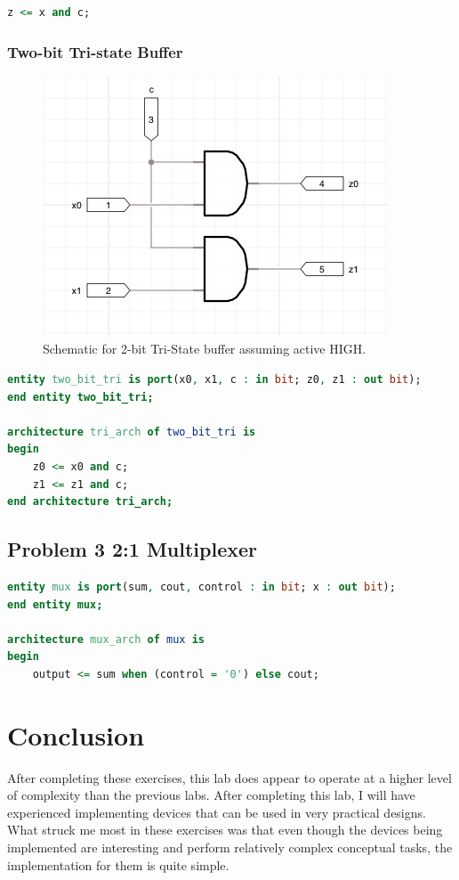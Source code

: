 \documentclass[11pt]{article}
\begin{document}
\begin{lstlisting}[language=VHDL]
	z <= x and c;
\end{lstlisting}


\subsubsection{Two-bit Tri-state Buffer}

\begin{figure}[H]
\begin{center}
	\includegraphics{img3_1.png}
	\caption{\label{fig:triStateSchematic} Schematic for 2-bit Tri-State buffer assuming active HIGH.}
\end{center}
\end{figure}

\begin{lstlisting}[language=VHDL]
entity two_bit_tri is port(x0, x1, c : in bit; z0, z1 : out bit);
end entity two_bit_tri;
	
architecture tri_arch of two_bit_tri is
begin
	z0 <= x0 and c;
	z1 <= z1 and c;
end architecture tri_arch;
\end{lstlisting}

\subsection{Problem 3 2:1 Multiplexer}

\begin{lstlisting}[language=VHDL]
entity mux is port(sum, cout, control : in bit; x : out bit);
end entity mux;

architecture mux_arch of mux is
begin
	output <= sum when (control = '0') else cout;	
\end{lstlisting}

\section{Conclusion}

After completing these exercises, this lab does appear to operate at a higher level of complexity than the previous labs. After completing this lab, I will have experienced implementing devices that can be used in very practical designs. What struck me most in these exercises was that even though the devices being implemented are interesting and perform relatively complex conceptual tasks, the implementation for them is quite simple.
\end{document}
